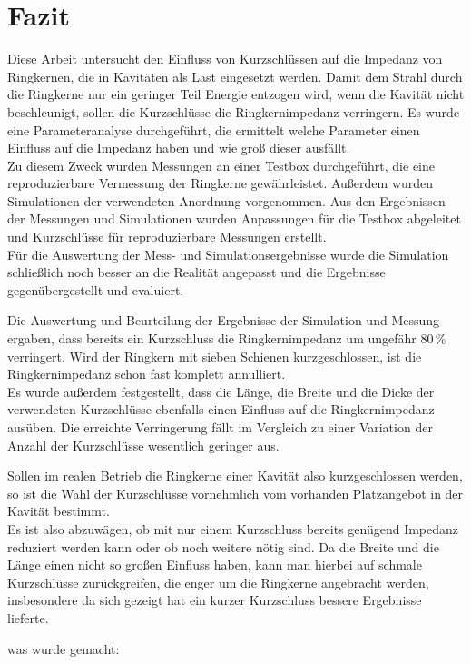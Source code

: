 \section{Fazit}
Diese Arbeit untersucht den Einfluss von Kurzschlüssen auf die Impedanz von Ringkernen, die in Kavitäten als Last eingesetzt werden. Damit dem Strahl durch die Ringkerne nur ein geringer Teil Energie entzogen wird, wenn die Kavität nicht beschleunigt, sollen die Kurzschlüsse die Ringkernimpedanz verringern. Es wurde eine Parameteranalyse durchgeführt, die ermittelt welche Parameter einen Einfluss auf die Impedanz haben und wie groß dieser ausfällt.\\
Zu diesem Zweck wurden Messungen an einer Testbox durchgeführt, die eine reproduzierbare Vermessung der Ringkerne gewährleistet. Außerdem wurden Simulationen der verwendeten Anordnung vorgenommen. Aus den Ergebnissen der Messungen und Simulationen wurden Anpassungen für die Testbox abgeleitet und Kurzschlüsse für reproduzierbare Messungen erstellt.\\
Für die Auswertung der Mess- und Simulationsergebnisse wurde die Simulation schließlich noch besser an die Realität angepasst und die Ergebnisse gegenübergestellt und evaluiert.
\par
Die Auswertung und Beurteilung der Ergebnisse der Simulation und Messung ergaben, dass bereits ein Kurzschluss die Ringkernimpedanz um ungefähr $80\,\%$ verringert. Wird der Ringkern mit sieben Schienen kurzgeschlossen, ist die Ringkernimpedanz schon fast komplett annulliert.\\
Es wurde außerdem festgestellt, dass die Länge, die Breite und die Dicke der verwendeten Kurzschlüsse ebenfalls einen Einfluss auf die Ringkernimpedanz ausüben. Die erreichte Verringerung fällt im Vergleich zu einer Variation der Anzahl der Kurzschlüsse wesentlich geringer aus.
\par
Sollen im realen Betrieb die Ringkerne einer Kavität also kurzgeschlossen werden, so ist die Wahl der Kurzschlüsse vornehmlich vom vorhanden Platzangebot in der Kavität bestimmt.\\
Es ist also abzuwägen, ob mit nur einem Kurzschluss bereits genügend Impedanz reduziert werden kann oder ob noch weitere nötig sind. Da die Breite und die Länge einen nicht so großen Einfluss haben, kann man hierbei auf schmale Kurzschlüsse zurückgreifen, die enger um die Ringkerne angebracht werden, insbesondere da sich gezeigt hat ein kurzer Kurzschluss bessere Ergebnisse lieferte.
\par 
was wurde gemacht:

